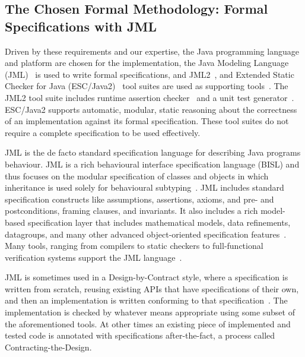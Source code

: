 \documentclass[english]{lni}
\begin{document}
\subsection{The Chosen Formal Methodology: Formal Specifications with JML}

Driven by these requirements and our expertise, the Java programming language and platform are chosen for the implementation, the Java Modeling Language (JML)~\cite{LeavensBakerRuby-Prelim} is used to write formal specifications, and JML2~\cite{JML2}, and Extended Static Checker for Java (ESC/Java2)~\cite{ESCJava2,KiniryCok04SmallCite} tool suites are used as supporting tools~\cite{BurdyEtal05-STTT}.  
The JML2 tool suite includes runtime assertion checker~\cite{Cheon-Leavens02b} and a unit test generator~\cite{Cheon2002}.
ESC/Java2 supports automatic, modular, static reasoning about the correctness of an implementation against its formal specification.
These tool suites do not require a complete specification to be used effectively.

JML is the de facto standard specification language for describing Java programs behaviour.  
JML is a rich behavioural interface specification language (BISL) and thus focuses on the modular specification of classes and objects in which inheritance is used solely for behavioural subtyping~\cite{LeavensBakerRuby99}.  
JML includes standard specification constructs like assumptions, assertions, axioms, and pre- and postconditions, framing clauses, and invariants.
It also includes a rich model-based specification layer that includes mathematical models, data refinements, datagroups, and many other advanced object-oriented specification features~\cite{Chalin06}.  
Many tools, ranging from compilers to static checkers to full-functional verification systems support the JML language~\cite{BurdyEtal05-STTT}.

JML is sometimes used in a Design-by-Contract style, where a specification is written from scratch, reusing existing APIs that have
specifications of their own, and then an implementation is written conforming to that specification~\cite{Meyer92b}.  
The implementation is checked by whatever means appropriate using some subset of the aforementioned tools.  
At other times an existing piece of implemented and tested code is annotated with specifications after-the-fact, a process called Contracting-the-Design.
\end{document}
